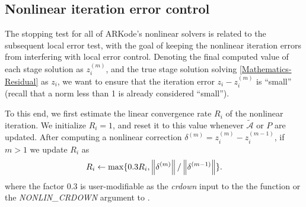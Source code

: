 \documentclass[letterpaper,10pt,english]{sphinxmanual}
\begin{document}
\subsection{Nonlinear iteration error control}
\label{Mathematics:nonlinear-iteration-error-control}\label{Mathematics:mathematics-error-nonlinear}
The stopping test for all of ARKode's nonlinear solvers is related to
the subsequent local error test, with the goal of keeping the
nonlinear iteration errors from interfering with local error control.
Denoting the final computed value of each stage solution as
\(z_i^{(m)}\), and the true stage solution solving \eqref{Mathematics-Residual}
as \(z_i\), we want to ensure that the iteration error
\(z_i - z_i^{(m)}\) is ``small'' (recall that a norm less than 1 is
already considered ``small'').

To this end, we first estimate the linear convergence rate \(R_i\)
of the nonlinear iteration.  We initialize \(R_i=1\), and reset it
to this value whenever \(\tilde{\mathcal A}\) or \(P\) are
updated.  After computing a nonlinear correction \(\delta^{(m)} =
z_i^{(m)} - z_i^{(m-1)}\), if \(m>1\) we update \(R_i\) as
\begin{gather}
\begin{split}R_i \leftarrow \max\{ 0.3 R_i, \left\|\delta^{(m)}\right\| / \left\|\delta^{(m-1)}\right\| \}.\end{split}\notag
\end{gather}
where the factor 0.3 is user-modifiable as the \emph{crdown} input to the
the function {\hyperref[c_interface/User_callable:c.ARKodeSetNonlinCRDown]{\emph{}}} or the \emph{NONLIN\_CRDOWN}
argument to {\hyperref[f_interface/Usage:f/_/FARKSETRIN]{\emph{}}}.
\end{document}
